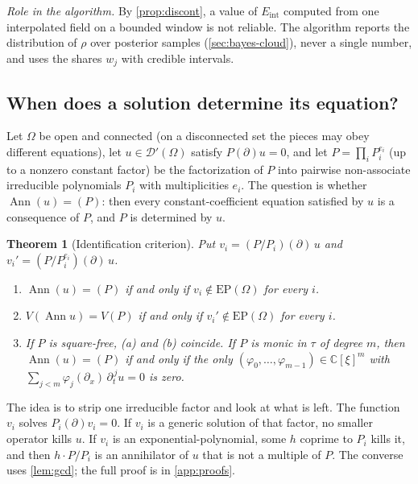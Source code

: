 \documentclass[11pt]{article}
\theoremstyle{plain}
\newtheorem{theorem}{Theorem}[section]
\theoremstyle{definition}
\theoremstyle{remark}
\newcommand{\C}{\mathbb{C}}
\DeclareMathOperator{\Ann}{Ann}             %
\newcommand{\Var}{V}                        %
\newcommand{\EP}{\mathrm{EP}}               %
\newcommand{\Eint}{E_{\mathrm{int}}}        %
\newcommand{\roleinalg}[1]{\par\noindent\emph{Role in the algorithm.} #1\par}
\begin{document}
\roleinalg{By \cref{prop:discont}, a value of $\Eint$ computed from one interpolated field on a
bounded window is not reliable. The algorithm reports the distribution of $\rho$ over posterior samples
(\cref{sec:bayes-cloud}), never a single number, and uses the shares $w_j$ with credible intervals.}



\subsection{When does a solution determine its equation?}\label{sec:ident}
Let $\Omega$ be open and connected (on a disconnected set the pieces may obey different equations),
let $u\in\mathcal D'(\Omega)$ satisfy $P(\partial)u=0$, and let $P=\prod_iP_i^{e_i}$ (up to a nonzero constant factor) be the
factorization of $P$ into pairwise non-associate irreducible polynomials $P_i$ with multiplicities
$e_i$. The question is whether $\Ann(u)=(P)$: then every constant-coefficient equation satisfied by
$u$ is a consequence of $P$, and $P$ is determined by $u$.

\begin{theorem}[Identification criterion]\label{thm:ident}
Put $v_i=(P/P_i)(\partial)\,u$ and $v_i'=(P/P_i^{e_i})(\partial)\,u$.
\begin{enumerate}[label=(\alph*)]
  \item $\Ann(u)=(P)$ if and only if $v_i\notin\EP(\Omega)$ for every $i$.
  \item $\Var(\Ann u)=\Var(P)$ if and only if $v_i'\notin\EP(\Omega)$ for every $i$.
  \item If $P$ is square-free, (a) and (b) coincide. If $P$ is monic in $\tau$ of degree $m$, then
  $\Ann(u)=(P)$ if and only if the only $(\varphi_0,\dots,\varphi_{m-1})\in\C[\xi]^m$ with
  $\sum_{j<m}\varphi_j(\partial_x)\,\partial_t^{\,j}u=0$ is zero.
\end{enumerate}
\end{theorem}

The idea is to strip one irreducible factor and look at what is left. The function $v_i$ solves
$P_i(\partial)v_i=0$. If $v_i$ is a generic solution of that factor, no smaller operator kills $u$.
If $v_i$ is an exponential-polynomial, some $h$ coprime to $P_i$ kills it, and then
$h\cdot P/P_i$ is an annihilator of $u$ that is not a multiple of $P$. The converse uses
\cref{lem:gcd}; the full proof is in \cref{app:proofs}.
\end{document}
